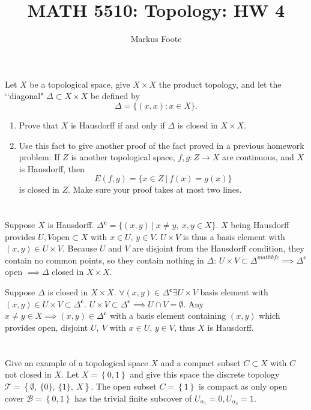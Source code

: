 \documentclass{jhwhw}
\title{MATH 5510: Topology: HW 4}
\author{Markus Foote}
\newcommand{\T}{{\mathcal T}}
\newcommand{\B}{{\mathcal B}}
\begin{document}
\problem{}%
Let $X$ be a topological space, give $X\times X$ the product topology, and let the \lq\lq diagonal"  $\Delta\subset X\times X$ be defined by 
$$
\Delta =\{ (x,x): x\in X\}.
$$
\begin{enumerate}
	
	\item Prove that $X$ is Hausdorff if and only if $\Delta$ is closed in $X\times X$.
	
	\item Use this fact to give another proof of the fact proved in a previous homework problem:  If $Z$ is another topological space, $f,g:Z\to X$ are continuous, and $X$ is Hausdorff, then
	$$
	E(f,g) = \{x\in Z \ | \ f(x) = g(x)\}
	$$ 
	is closed in $Z$.  Make sure your proof takes at most two lines.
\end{enumerate}
\solution{}
\part{}
Suppose $X$ is Hausdorff. $\Delta^{\mathbf{c}}=\{(x,y)\ | \ x\ne y,\ x,y\in X\}$. $X$ being Hausdorff provides $U,V \mathrm{ open }\subset X$ with $x\in U$, $y\in V$. $U\times V$ is thus a basis element with $(x,y) \in U\times V$. Because $U$ and $V$ are disjoint from the Hausdorff condition, they contain no common points, so they contain nothing in $\Delta$: $U\times V \subset \Delta^{mathbf{c}}\implies \Delta^{\mathbf{c}}$ open $\implies \Delta$ closed in $X\times X$.

Suppose $\Delta$ is closed in $X\times X$. $\forall (x,y)\in \Delta^{\mathbf{c}} \exists U\times V$ basis element with $(x,y)\in U\times V \subset \Delta^{\mathbf{c}}$. $U\times V \subset \Delta^{\mathbf{c}} \implies U\cap V=\emptyset$. Any $x\ne y\in X \implies (x,y)\in \Delta^{\mathbf{c}}$ with a basis element containing $(x,y)$ which provides open, disjoint $U,\ V$ with $x\in U$, $y\in V$, thus $X$ is Hausdorff.


\part{}



\problem{} %
Give an example of a topological space $X$ and a compact subset $C\subset X$ with $C$ not closed in $X$.
\solution{}
Let $X=\left\{ 0,1\right\}$ and give this space the discrete topology $\T=\left\{ \emptyset,\ \{0\},\ \{1\},\ X\right\}$. The open subset $C=\left\{ 1\right\}$ is compact as only open cover $\B =\left\{0,1\right\}$ has the trivial finite subcover of $U_{\alpha_1}=0, U_{\alpha_2}=1$. 
\end{document}
